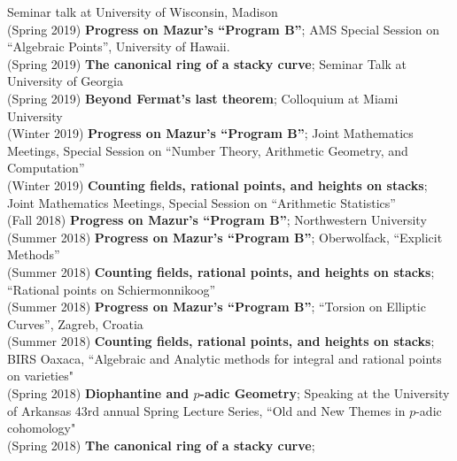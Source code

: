 \documentclass[margin,line]{res}
\begin{document}
\begin{resume}
Seminar talk at  University of Wisconsin, Madison
\vspace{.05cm}\\
(Spring 2019) \textbf{Progress on Mazur's ``Program B''};  
AMS Special Session on ``Algebraic Points'', University of Hawaii.
\vspace{.05cm}\\
(Spring 2019) \textbf{The canonical ring of a stacky curve};  
Seminar Talk at University of Georgia
\vspace{.05cm}\\
(Spring 2019) \textbf{Beyond Fermat's last theorem};
Colloquium at Miami University 
\vspace{.05cm}\\
(Winter 2019) \textbf{Progress on Mazur's ``Program B''};  
Joint Mathematics Meetings, Special Session on ``Number Theory, Arithmetic Geometry, and Computation''
\vspace{.05cm}\\
(Winter 2019) \textbf{Counting fields, rational points, and heights on stacks};
Joint Mathematics Meetings, Special Session on ``Arithmetic Statistics''
\vspace{.05cm}\\
(Fall 2018) \textbf{Progress on Mazur's ``Program B''};  
Northwestern University
\vspace{.05cm}\\
(Summer 2018) \textbf{Progress on Mazur's ``Program B''};  
Oberwolfack, ``Explicit Methods''
\vspace{.05cm}\\
(Summer 2018) \textbf{Counting fields, rational points, and heights on stacks};
``Rational points on Schiermonnikoog''
\vspace{.05cm}\\
(Summer 2018) \textbf{Progress on Mazur's ``Program B''};  
``Torsion on Elliptic Curves'', Zagreb, Croatia
\vspace{.05cm}\\
(Summer 2018) \textbf{Counting fields, rational points, and heights on stacks};
BIRS Oaxaca, ``Algebraic and Analytic methods for integral and rational points on varieties"
\vspace{.05cm}\\
(Spring 2018) \textbf{Diophantine and $p$-adic Geometry};
Speaking at the University of Arkansas 43rd annual Spring Lecture Series, ``Old and New Themes in $p$-adic cohomology"
\vspace{.05cm}\\
(Spring 2018) \textbf{The canonical ring of a stacky curve};  

\end{resume}
\end{document}

